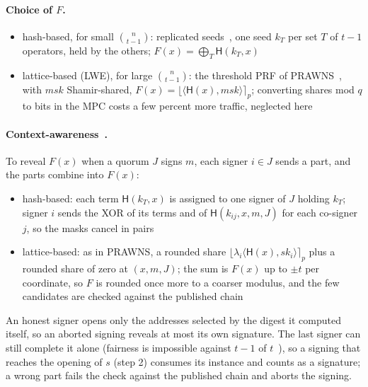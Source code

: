 \documentclass[11pt]{article}
\newcommand{\hash}{\mathsf{H}}
\begin{document}
\paragraph{Choice of $F$.}
\begin{itemize}
  \item hash-based, for small $\binom{n}{t-1}$: replicated seeds~\cite{CDI05}, one seed $k_T$ per set $T$ of $t-1$
        operators, held by the others; $F(x)=\bigoplus_T\hash(k_T,x)$
  \item lattice-based (LWE), for large $\binom{n}{t-1}$: the threshold PRF of PRAWNS~\cite{PRAWNS}, with
        $\mathit{msk}$ Shamir-shared, $F(x)=\lfloor\langle\hash(x),\mathit{msk}\rangle\rceil_p$; converting shares
        mod $q$ to bits in the MPC costs a few percent more traffic, neglected here
\end{itemize}
\paragraph{Context-awareness~\cite{PRAWNS}.} To reveal $F(x)$ when a quorum $J$ signs $m$, each signer $i\in J$
sends a part, and the parts combine into $F(x)$:
\begin{itemize}
  \item hash-based: each term $\hash(k_T,x)$ is assigned to one signer of $J$ holding $k_T$; signer $i$ sends the XOR
        of its terms and of $\hash(k_{ij},x,m,J)$ for each co-signer $j$, so the masks cancel in pairs
  \item lattice-based: as in PRAWNS, a rounded share $\lfloor\lambda_i\langle\hash(x),\mathit{sk}_i\rangle\rceil_p$
        plus a rounded share of zero at $(x,m,J)$; the sum is $F(x)$ up to $\pm t$ per coordinate, so $F$ is rounded
        once more to a coarser modulus, and the few candidates are checked against the published chain
\end{itemize}
An honest signer opens only the addresses selected by the digest it computed itself, so an aborted signing reveals
at most its own signature. The last
signer can still complete it alone (fairness is impossible against $t-1$ of $t$~\cite{Cle86}), so a signing that
reaches the opening of $s$ (step 2) consumes its instance and counts as a signature; a wrong part fails the check
against the published chain and aborts the signing.
\end{document}
